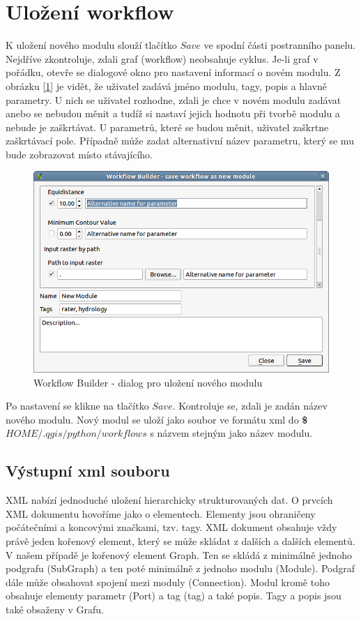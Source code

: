 \newpage
\section{Uložení workflow}
\nocite{demel:book}

K uložení nového modulu slouží tlačítko $Save$ ve spodní části postranního panelu. Nejdříve  zkontroluje, zdali graf (workflow) neobsahuje cyklus. Je-li graf v pořádku, otevře se dialogové okno pro nastavení informací o novém modulu. Z obrázku [\figurename \ref{wf:saveDialog}] je vidět, že uživatel zadává jméno modulu, tagy, popis a hlavně parametry. U nich se uživatel rozhodne, zdali je chce v novém modulu zadávat anebo se nebudou měnit a tudíž si nastaví jejich hodnotu při tvorbě modulu a nebude je zaškrtávat. U parametrů, které se budou měnit, uživatel zaškrtne zaškrtávací pole. Případně může zadat alternativní název parametru, který se mu bude zobrazovat místo stávajícího.

\begin{figure}[h]
	\centering
	\includegraphics[scale=0.6]{pictures/wf/wf_saveDialog}
	\caption{Workflow Builder - dialog pro uložení nového modulu}
  	\label{wf:saveDialog}
\end{figure}

Po nastavení se klikne na tlačítko $Save$. Kontroluje se, zdali je zadán název nového modulu. Nový modul se uloží jako soubor ve formátu xml do \textbf{\$$HOME/.qgis/python/workflows$} s názvem stejným jako název modulu.  

\subsection{Výstupní xml souboru}
XML nabízí jednoduché uložení hierarchicky strukturovaných dat. O prvcích XML dokumentu hovoříme jako o elementech. Elementy jsou ohraničeny počátečními a koncovými značkami, tzv. tagy. XML dokument obsahuje vždy právě jeden kořenový element, který se může skládat z dalších a dalších elementů. V našem případě je kořenový element Graph. Ten se skládá z minimálně jednoho podgrafu (SubGraph) a ten poté minimálně z jednoho modulu (Module). Podgraf dále může obsahovat spojení mezi moduly (Connection). Modul kromě toho obsahuje elementy parametr (Port) a tag (tag) a také popis.  Tagy a popis jsou také obsaženy v Grafu. \\

